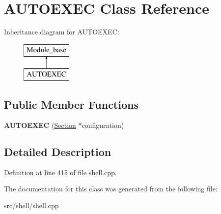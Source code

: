 \hypertarget{classAUTOEXEC}{\section{A\-U\-T\-O\-E\-X\-E\-C Class Reference}
\label{classAUTOEXEC}
}
Inheritance diagram for A\-U\-T\-O\-E\-X\-E\-C\-:\begin{figure}[H]
\begin{center}
\leavevmode
\includegraphics[height=2.000000cm]{classAUTOEXEC}
\end{center}
\end{figure}
\subsection*{Public Member Functions}
\begin{DoxyCompactItemize}
\item 
\hypertarget{classAUTOEXEC_a0c36ab7cc15d2e8ed2fc590cafc89672}{{\bfseries A\-U\-T\-O\-E\-X\-E\-C} (\hyperlink{classSection}{Section} $\ast$configuration)}\label{classAUTOEXEC_a0c36ab7cc15d2e8ed2fc590cafc89672}

\end{DoxyCompactItemize}


\subsection{Detailed Description}


Definition at line 415 of file shell.\-cpp.



The documentation for this class was generated from the following file\-:\begin{DoxyCompactItemize}
\item 
src/shell/shell.\-cpp\end{DoxyCompactItemize}
